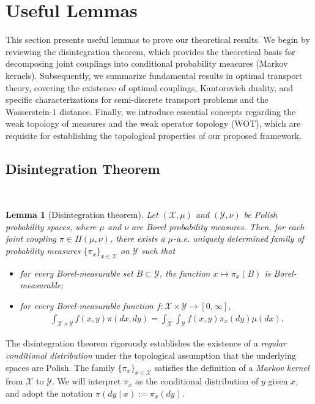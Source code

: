 \documentclass{article}
\theoremstyle{plain}
\newtheorem{lemma}[theorem]{Lemma}
\theoremstyle{definition}
\theoremstyle{remark}
\begin{document}
\section{Useful Lemmas}\label{App:useful-lemmas}
This section presents useful lemmas to prove our theoretical results. We begin by reviewing the disintegration theorem, which provides the theoretical basis for decomposing joint couplings into conditional probability measures (Markov kernels). Subsequently, we summarize fundamental results in optimal transport theory, covering the existence of optimal couplings, Kantorovich duality, and specific characterizations for semi-discrete transport problems and the Wasserstein-$1$ distance. Finally, we introduce essential concepts regarding the weak topology of measures and the weak operator topology (WOT), which are requisite for establishing the topological properties of our proposed framework.

\vspace{4mm}
\subsection{Disintegration Theorem}~\label{App:disintegration-theorem}\vspace{-3mm}
\begin{lemma}[Disintegration theorem]
	\label{lem:disintegration}
	Let $(\mathcal{X},\mu)$ and $(\mathcal{Y},\nu)$ be Polish probability spaces, where $\mu$ and $\nu$ are Borel probability measures. Then, for each joint coupling $\pi \in \Pi(\mu,\nu)$, there exists a $\mu$-a.e. uniquely determined family of probability measures $\{\pi_x\}_{x \in \mathcal{X}}$ on $\mathcal{Y}$ such that
	\begin{itemize}
		\item for every Borel-measurable set $B \subset \mathcal{Y}$, the function $x \mapsto \pi_x(B)$ is Borel-measurable;
		\item for every Borel-measurable function $f : \mathcal{X} \times \mathcal{Y} \to [0,\infty]$,
		\begin{align*}
			\int_{\mathcal{X} \times \mathcal{Y}} f(x,y) \pi(dx,dy) = \int_{\mathcal{X}} \int_{\mathcal{Y}} f(x,y) \pi_x(dy) \mu(dx) .
		\end{align*}
	\end{itemize}
\end{lemma}
The disintegration theorem rigorously establishes the existence of a \textit{regular conditional distribution} under the topological assumption that the underlying spaces are Polish. The family $\{\pi_x\}_{x \in \mathcal{X}}$ satisfies the definition of a \textit{Markov kernel} from $\mathcal{X}$ to $\mathcal{Y}$. We will interpret $\pi_x$ as the conditional distribution of $y$ given $x$, and adopt the notation $\pi(dy \mid x) := \pi_x(dy)$.
\end{document}
